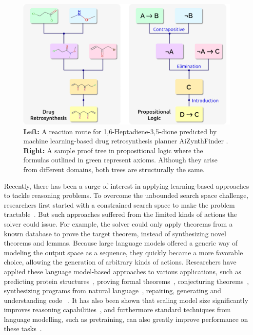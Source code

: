 \begin{figure}[t]
\centering
\includegraphics[scale=0.35]{capabilities/figures/Reasoning_2.png}
\caption{\label{fig:reasoning-retrosynthesis} \textbf{Left:} A reaction route for 1,6-Heptadiene-3,5-dione predicted by machine learning-based drug retrosynthesis planner AiZynthFinder \cite{genheden2020retrosynthesis,yoshikawa2021retrosynthesis-twitter}. \textbf{Right:} A sample proof tree in propositional logic where the formulas outlined in green represent axioms. Although they arise from different domains, both trees are structurally the same.}
\end{figure}

Recently, there has been a surge of interest in applying learning-based approaches to tackle reasoning problems. 
To overcome the unbounded search space challenge, researchers first started with a constrained search space to make the problem tractable~\citep{DBLP:journals/corr/abs-1806-00608, DBLP:conf/icml/BansalLRSW19}. 
But such approaches suffered from the limited kinds of actions the solver could issue. For example, the solver could only apply theorems from a known database to prove the target theorem, instead of synthesizing novel theorems and lemmas. 
Because large language models offered a generic way of modeling the output space as a sequence, they quickly became a more favorable choice, allowing the generation of arbitrary kinds of actions.
Researchers have applied these language model-based approaches to various applications, such as predicting protein structures~\citep{DBLP:journals/nature/Senior0JKSGQZNB20}, proving formal theorems~\citep{DBLP:journals/corr/polu2020generative,pact},  conjecturing theorems~\citep{DBLP:conf/mkm/UrbanJ20,DBLP:journals/corr/abs-2006-04757,li2021isarstep}, synthesizing programs from natural language~\cite{chen2021evaluating,ling2016latent}, repairing, generating and understanding code ~\citep{yasunaga2021break,DBLP:journals/corr/abs-2102-04664,guo2020graphcodebert,svyatkovskiy2020intellicode,kim2021code,zugner2021language}. It has also been shown that scaling model size significantly improves reasoning capabilities~\citep{DBLP:journals/corr/polu2020generative}, and furthermore standard techniques from language modelling, such as pretraining, can also greatly improve performance on these tasks~\citep{DBLP:journals/corr/abs-2006-04757,DBLP:journals/corr/polu2020generative}.

